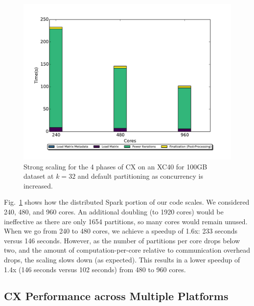     \begin{figure} [h!btp]
    \begin{centering}
    \includegraphics[scale=0.4]{images/CX_Strong_Scaling_New_Colors_Axes_Rank_32_Partitions_default.pdf}
    \end{centering}
    \caption{ Strong scaling for the 4 phases of CX on an XC40 for 100GB dataset at $k=32$ and default partitioning as concurrency is increased.} 
    \label{fig:xc40scaling}
    \end{figure} 

Fig.~\ref{fig:xc40scaling} shows how the distributed Spark portion of our code scales. %
We considered 240, 480, and 960 cores.  An additional doubling (to 1920 cores) would be ineffective as there are only 1654 partitions, 
so many cores would remain unused.  
When we go from 240 to 480 cores, we achieve a speedup of 1.6x: %
233 seconds versus 146 seconds.  However, as the number of partitions per core drops 
below two, and the amount of computation-per-core relative to communication overhead drops, 
the scaling slows down (as expected).  
This results in a lower speedup of 1.4x (146 seconds versus 102
seconds) from 480 to 960 cores.

  \subsection{CX Performance across Multiple Platforms}
  \label{sect:h2h}
    
